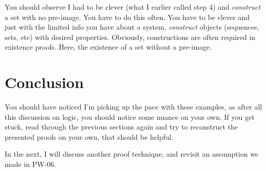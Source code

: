 You should observe I had to be clever (what I earlier called step 4) and \textit{construct} a set with no pre-image. You have to do this often. You have to be clever and just with the limited info you have about a system, \textit{construct} objects (sequences, sets, etc) with desired properties. Obviously, constructions are often required in existence proofs. Here, the existence of a set without a pre-image.
\section*{Conclusion}
You should have noticed I'm picking up the pace with these examples, as after all this discussion on logic, you should notice some nuance on your own. If you get stuck, read through the previous sections again and try to reconstruct the presented proofs on your own, that should be helpful.

In the next, I will discuss another proof technique, and revisit an assumption we made in PW-06.
